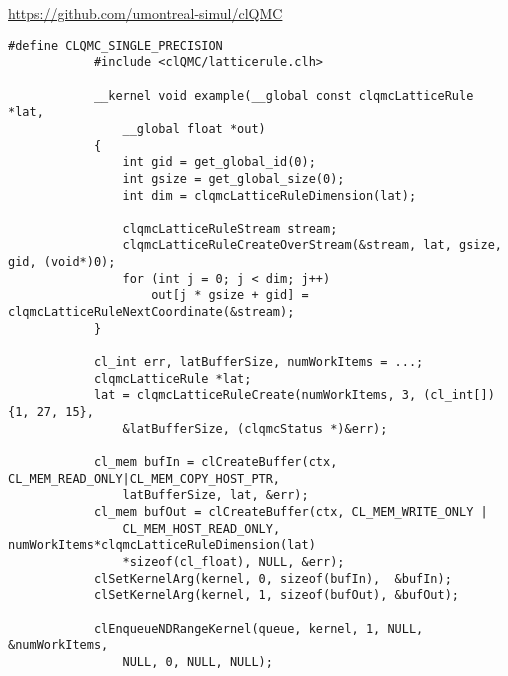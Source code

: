 			\url{https://github.com/umontreal-simul/clQMC}
			\begin{lstlisting}[caption=clQMC Beispiel]    
			#define CLQMC_SINGLE_PRECISION                                 
			#include <clQMC/latticerule.clh>                               
                                                                       
			__kernel void example(__global const clqmcLatticeRule *lat, 
				__global float *out)                     
			{                                                              
				int gid = get_global_id(0);                                
				int gsize = get_global_size(0);                            
				int dim = clqmcLatticeRuleDimension(lat);                  
                                                                       
				clqmcLatticeRuleStream stream;                             
				clqmcLatticeRuleCreateOverStream(&stream, lat, gsize, gid, (void*)0);  
				for (int j = 0; j < dim; j++) 
					out[j * gsize + gid] = clqmcLatticeRuleNextCoordinate(&stream); 
			}
			
			cl_int err, latBufferSize, numWorkItems = ...;
			clqmcLatticeRule *lat;               
			lat = clqmcLatticeRuleCreate(numWorkItems, 3, (cl_int[]){1, 27, 15}, 
				&latBufferSize, (clqmcStatus *)&err);  

			cl_mem bufIn = clCreateBuffer(ctx, CL_MEM_READ_ONLY|CL_MEM_COPY_HOST_PTR, 
				latBufferSize, lat, &err);
			cl_mem bufOut = clCreateBuffer(ctx, CL_MEM_WRITE_ONLY | 
				CL_MEM_HOST_READ_ONLY, numWorkItems*clqmcLatticeRuleDimension(lat) 
				*sizeof(cl_float), NULL, &err);
			clSetKernelArg(kernel, 0, sizeof(bufIn),  &bufIn);
			clSetKernelArg(kernel, 1, sizeof(bufOut), &bufOut);

			clEnqueueNDRangeKernel(queue, kernel, 1, NULL, &numWorkItems, 
				NULL, 0, NULL, NULL);
			\end{lstlisting}
			